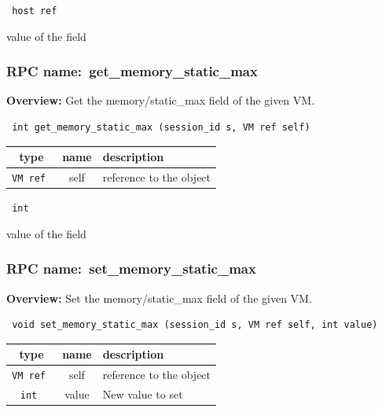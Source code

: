 \vspace{0.3cm}

{\tt 
host ref
}


value of the field
\vspace{0.3cm}
\vspace{0.3cm}
\vspace{0.3cm}
\subsubsection{RPC name:~get\_memory\_static\_max}

{\bf Overview:} 
Get the memory/static\_max field of the given VM.

\begin{verbatim} int get_memory_static_max (session_id s, VM ref self)\end{verbatim}



 
\vspace{0.3cm}
\begin{tabular}{|c|c|p{7cm}|}
 \hline
{\bf type} & {\bf name} & {\bf description} \\ \hline
{\tt VM ref } & self & reference to the object \\ \hline 

\end{tabular}

\vspace{0.3cm}

{\tt 
int
}


value of the field
\vspace{0.3cm}
\vspace{0.3cm}
\vspace{0.3cm}
\subsubsection{RPC name:~set\_memory\_static\_max}

{\bf Overview:} 
Set the memory/static\_max field of the given VM.

\begin{verbatim} void set_memory_static_max (session_id s, VM ref self, int value)\end{verbatim}



 
\vspace{0.3cm}
\begin{tabular}{|c|c|p{7cm}|}
 \hline
{\bf type} & {\bf name} & {\bf description} \\ \hline
{\tt VM ref } & self & reference to the object \\ \hline 

{\tt int } & value & New value to set \\ \hline 

\end{tabular}

